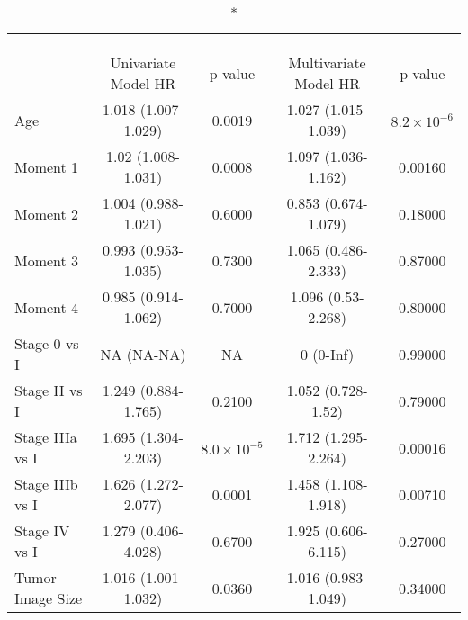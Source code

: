 \captionsetup[table]{labelformat=empty,skip=1pt}
\begin{longtable}{lcccc}
\caption*{
\large Cox Proportional Hazard Model\\ 
\small \\ 
} \\ 
\toprule
 & Univariate Model HR & p-value & Multivariate Model HR & p-value \\ 
\midrule
Age & 1.018 (1.007-1.029) & 0.0019 & 1.027 (1.015-1.039) & $8.2 \times 10^{-6}$ \\ 
Moment 1 & 1.02 (1.008-1.031) & 0.0008 & 1.097 (1.036-1.162) & 0.00160 \\ 
Moment 2 & 1.004 (0.988-1.021) & 0.6000 & 0.853 (0.674-1.079) & 0.18000 \\ 
Moment 3 & 0.993 (0.953-1.035) & 0.7300 & 1.065 (0.486-2.333) & 0.87000 \\ 
Moment 4 & 0.985 (0.914-1.062) & 0.7000 & 1.096 (0.53-2.268) & 0.80000 \\ 
Stage 0 vs I & NA (NA-NA) & NA & 0 (0-Inf) & 0.99000 \\ 
Stage II vs I & 1.249 (0.884-1.765) & 0.2100 & 1.052 (0.728-1.52) & 0.79000 \\ 
Stage IIIa vs I & 1.695 (1.304-2.203) & $8.0 \times 10^{-5}$ & 1.712 (1.295-2.264) & 0.00016 \\ 
Stage IIIb vs I & 1.626 (1.272-2.077) & 0.0001 & 1.458 (1.108-1.918) & 0.00710 \\ 
Stage IV vs I & 1.279 (0.406-4.028) & 0.6700 & 1.925 (0.606-6.115) & 0.27000 \\ 
Tumor Image Size & 1.016 (1.001-1.032) & 0.0360 & 1.016 (0.983-1.049) & 0.34000 \\ 
\bottomrule
\end{longtable}

